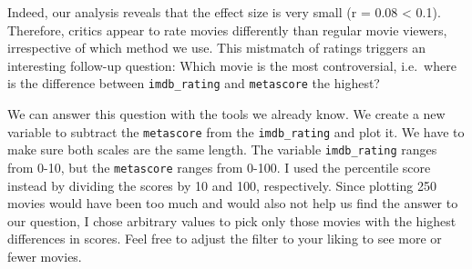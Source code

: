 \documentclass[
]{book}
\begin{document}
Indeed, our analysis reveals that the effect size is very small (r = 0.08 \textless{} 0.1). Therefore, critics appear to rate movies differently than regular movie viewers, irrespective of which method we use. This mistmatch of ratings triggers an interesting follow-up question: Which movie is the most controversial, i.e.~where is the difference between \texttt{imdb\_rating} and \texttt{metascore} the highest?

We can answer this question with the tools we already know. We create a new variable to subtract the \texttt{metascore} from the \texttt{imdb\_rating} and plot it. We have to make sure both scales are the same length. The variable \texttt{imdb\_rating} ranges from 0-10, but the \texttt{metascore} ranges from 0-100. I used the percentile score instead by dividing the scores by 10 and 100, respectively. Since plotting 250 movies would have been too much and would also not help us find the answer to our question, I chose arbitrary values to pick only those movies with the highest differences in scores. Feel free to adjust the filter to your liking to see more or fewer movies.
\end{document}

